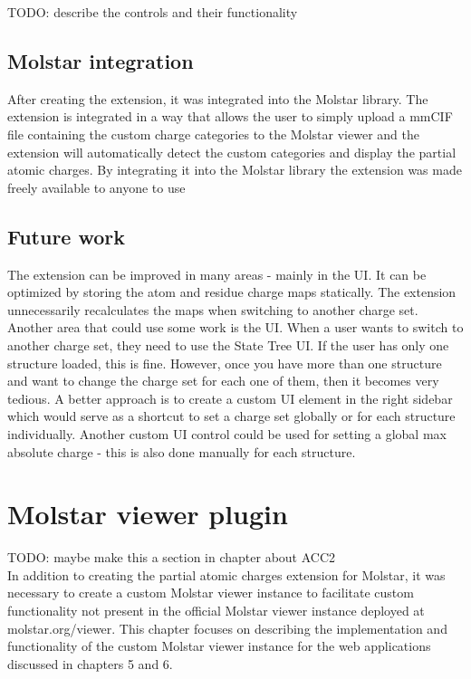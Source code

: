 \documentclass[
  digital,     %
  oneside,     %
  nosansbold,  %
  nocolorbold, %
  lof,         %
  lot,         %
]{fithesis4}
\begin{document}
TODO: describe the controls and their functionality

\section{Molstar integration}

After creating the extension, it was integrated into the Molstar library. The extension is integrated in a way that allows the user to simply upload a mmCIF file containing the custom charge categories to the Molstar viewer and the extension will automatically detect the custom categories and display the partial atomic charges. By integrating it into the Molstar library the extension was made freely available to anyone to use

\section{Future work}

The extension can be improved in many areas - mainly in the UI. It can be optimized by storing the atom and residue charge maps statically. The extension unnecessarily recalculates the maps when switching to another charge set. Another area that could use some work is the UI. When a user wants to switch to another charge set, they need to use the State Tree UI. If the user has only one structure loaded, this is fine. However, once you have more than one structure and want to change the charge set for each one of them, then it becomes very tedious. A better approach is to create a custom UI element in the right sidebar which would serve as a shortcut to set a charge set globally or for each structure individually. Another custom UI control could be used for setting a global max absolute charge - this is also done manually for each structure.

\chapter{Molstar viewer plugin}

TODO: maybe make this a section in chapter about ACC2 \\

In addition to creating the partial atomic charges extension for Molstar, it was necessary to create a custom Molstar viewer instance to facilitate custom functionality not present in the official Molstar viewer instance deployed at molstar.org/viewer. This chapter focuses on describing the implementation and functionality of the custom Molstar viewer instance for the web applications discussed in chapters 5 and 6.
\end{document}
